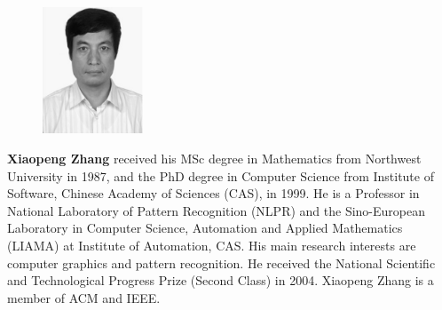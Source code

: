 \documentclass[preprint,10pt,5p,times,twocolumn]{elsarticle}
\begin{document}
\begin{figure}
\includegraphics [width=3cm,clip]{zhang.pdf}
\end{figure}
\textbf{Xiaopeng Zhang} received his MSc
degree in Mathematics from Northwest University in 1987, and the PhD degree in Computer Science from Institute of Software, Chinese Academy of Sciences (CAS), in 1999. He is a Professor in National Laboratory of Pattern Recognition (NLPR) and the Sino-European Laboratory in Computer Science, Automation and Applied Mathematics (LIAMA) at Institute of Automation, CAS. His main research interests are computer graphics and pattern recognition. He received the National Scientific and Technological Progress Prize (Second Class) in 2004. Xiaopeng Zhang is a member of ACM and IEEE.
\end{document}
